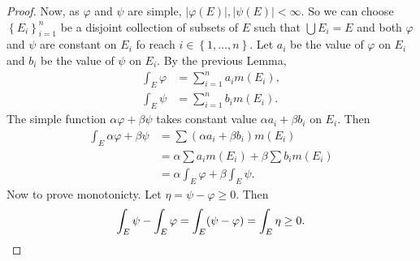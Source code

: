 \begin{proof}
	Now, as $\varphi$ and $\psi$ are simple,
	$\left\lvert \varphi(E) \right\rvert,
	\left\lvert \psi(E) \right\rvert < \infty$.
	So we can choose
	$
		\left\{
			E_i
		\right\}_{i=1}^n
	$
	be a disjoint collection of subsets of $E$ such that
	$\bigcup E_i = E$ and both $\varphi$ and $\psi$ are constant
	on $E_i$ fo reach $i \in \left\{
		1, \ldots, n
	\right\}$. 
	Let $a_i$ be the value of $\varphi$ on $E_i$ and $b_i$
	be the value of $\psi$ on $E_i$.
	By the previous Lemma,
	\begin{align*}
		\int_E \varphi &= \sum_{i=1}^n a_i m(E_i), \\
		\int_E \psi &= \sum_{i=1}^n b_i m(E_i).
	\end{align*}
	The simple function $\alpha\varphi + \beta\psi$ takes constant
	value $\alpha a_i + \beta b_i$ on $E_i$.
	Then
	\begin{align*}
		\int_E \alpha \varphi + \beta \psi
		&= \sum (\alpha a_i + \beta b_i) m(E_i) \\
		&= \alpha \sum a_i m(E_i) + \beta \sum b_i m(E_i) \\
		&= \alpha \int_E \varphi + \beta \int_E \psi.
	\end{align*}
	Now to prove monotonicty.
	Let $\eta = \psi - \varphi \geq 0$.
	Then
	\[
		\int_E \psi - \int_E \varphi
		= \int_E (\psi - \varphi)
		= \int_E \eta
		\geq 0. \qedhere
	\]
\end{proof}
